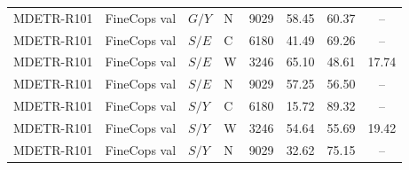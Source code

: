 \begin{table}[t]
\begin{tabular}{@{}llllcccc@{}}
MDETR-R101 & FineCops val & $G/Y$ & N & 9029 & 58.45 & 60.37 & --\\
MDETR-R101 & FineCops val & $S/E$ & C & 6180 & 41.49 & 69.26 & --\\
MDETR-R101 & FineCops val & $S/E$ & W & 3246 & 65.10 & 48.61 & 17.74\\
MDETR-R101 & FineCops val & $S/E$ & N & 9029 & 57.25 & 56.50 & --\\
MDETR-R101 & FineCops val & $S/Y$ & C & 6180 & 15.72 & 89.32 & --\\
MDETR-R101 & FineCops val & $S/Y$ & W & 3246 & 54.64 & 55.69 & 19.42\\
MDETR-R101 & FineCops val & $S/Y$ & N & 9029 & 32.62 & 75.15 & --\\
\bottomrule\end{tabular}
\end{table}

